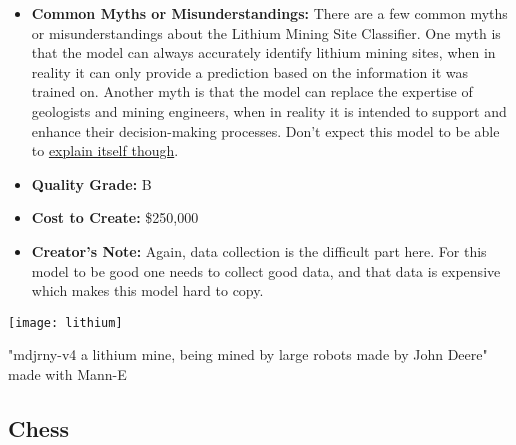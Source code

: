 \begin{itemize}
\item \textbf{Common Myths or Misunderstandings:} There are a few common myths or misunderstandings about the Lithium Mining Site Classifier. One myth is that the model can always accurately identify lithium mining sites, when in reality it can only provide a prediction based on the information it was trained on. Another myth is that the model can replace the expertise of geologists and mining engineers, when in reality it is intended to support and enhance their decision-making processes. Don't expect this model to be able to \hyperref[sec:explain]{explain itself though}.
    \item \textbf{Quality Grade:} B
    \item \textbf{Cost to Create:} \$250,000
    \item \textbf{Creator's Note:} Again, data collection is the difficult part here. For this model to be good one needs to collect good data, and that data is expensive which makes this model hard to copy. 
\end{itemize}

\begin{pdf}
\begin{marginfigure}[-5.5cm]
        \texttt{[image: lithium]}
        \caption{"mdjrny-v4 a lithium mine, being mined by large robots made by John Deere" made with Mann-E}
\end{marginfigure}
\end{pdf}

\subsection{Chess}

